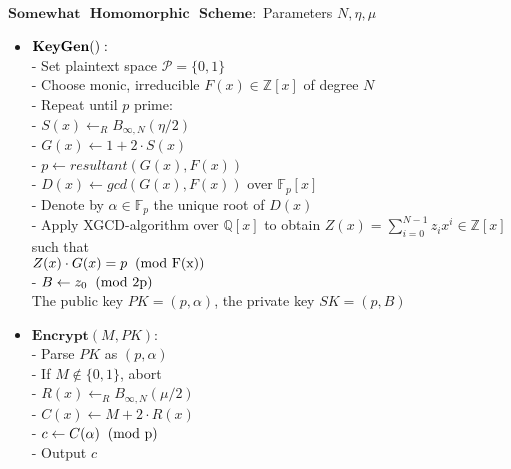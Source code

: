 \documentclass{beamer}
\newtheorem{cscheme}{Somewhat Homomorphic Scheme}
\begin{document}
\begin{frame}
\begin{scriptsize}
\begin{center}
$\mathbf{Somewhat\text{ }Homomorphic\text{ }Scheme}:$ Parameters $N, \eta, \mu$
\end{center}
\begin{itemize}
\item $\bold{KeyGen()}:$
\\- Set plaintext space $\mathcal{P} = \{0,1\}$
\\- Choose monic, irreducible $F(x)\in \mathbb{Z}[x]$ of degree $N$
\\- Repeat until $p$ prime: 
\\\hspace{3mm} - $S(x) \leftarrow_R B_{\infty, N}(\eta/2)$
\\\hspace{3mm} - $G(x) \leftarrow 1+2\cdot S(x)$
\\\hspace{3mm} - $p \leftarrow resultant(G(x), F(x))$
\\- $D(x) \leftarrow gcd(G(x),F(x))$ over $\mathbb{F}_p[x]$
\\- Denote by $\alpha \in \mathbb{F}_p$ the unique root of $D(x)$
\\- Apply XGCD-algorithm over $\mathbb{Q}[x]$ to obtain $Z(x) = \sum_{i = 0}^{N-1}z_ix^i\in \mathbb{Z}[x]$ such that 
\\\hspace{2mm}$Z(x)\cdot G(x) = p  \hspace{2mm} \text{(mod F(x))}$
\\- $B\leftarrow z_0 \hspace{2mm} \text{(mod 2p)}$
\\\vspace{0.5 mm} The public key $PK = (p,\alpha)$, the private key $SK = (p,B)$
\end{itemize}

\begin{minipage}{.45\textwidth}
\begin{itemize}
\item $\mathbf{Encrypt}(M, PK):$
\\- Parse $PK$ as $(p,\alpha)$
\\- If $M\notin \{0,1\}$, abort
\\- $R(x)\leftarrow_R B_{\infty, N}(\mu/2)$
\\- $C(x) \leftarrow M + 2\cdot R(x)$
\\- $c\leftarrow C(\alpha) \hspace{2mm} \text{(mod p)}$
\\- Output $c$


\end{itemize}
\end{minipage}
\end{scriptsize}
\end{frame}
\end{document}
